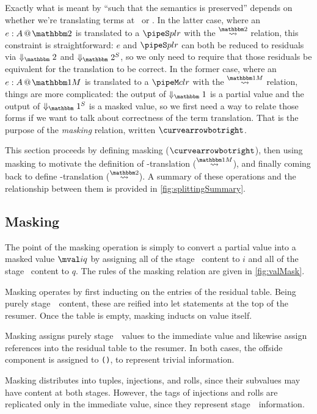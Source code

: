 \begin{abstrsyn}
Exactly what is meant by ``such that the semantics is preserved'' depends on whether we're translating
terms at \bbonem\ or \bbtwo.  
In the latter case, where an $\coltwo e A$ is translated to a $\pipeS p l r$ with the $\splittwosym$ relation,
this constraint is straightforward: $e$ and $\pipeS p l r$ can both be reduced to residuals
via $\redtwosym$ and $\sepredtwosym$, so we only need to require that those
residuals be equivalent for the translation to be correct.
In the former case, where an $\colmix e A$ is translated to a $\pipeM c l r$ with the $\splitonesym$ relation, 
things are more complicated: 
the output of $\redonesym$ is a partial value and the output of $\sepredonesym$ is a masked value,
so we first need a way to relate those forms if we want to talk about correctness of the term translation.
That is the purpose of the {\em masking} relation, written $\vsplito$.

This section proceeds by defining masking ($\vsplito$), 
then using masking to motivate the definition of \bbonem-translation ($\splitonesym$),
and finally coming back to define \bbtwo-translation ($\splittwosym$).
A summary of these operations and the relationship between them is provided in \ref{fig:splittingSummary}.

\subsection{Masking}

The point of the masking operation is simply to convert a partial value into a masked value $\mval i q$
by assigning all of the stage \bbone\ content to $i$ and all of the stage \bbtwo\ content to $q$.
The rules of the masking relation are given in \ref{fig:valMask}.

Masking operates by first inducting on the entries of the residual table.  
Being purely stage~\bbtwo\ content, these are reified into let statements at the top of the resumer.
Once the table is empty, masking inducts on value itself.

Masking assigns purely stage~\bbone\ values to the immediate value
and likewise assign references into the residual table to the resumer.
In both cases, the offside component is assigned to \texttt{()}, to represent trivial information.

Masking distributes into tuples, injections, and rolls, since their subvalues may have content at both stages.
However, the tags of injections and rolls are replicated only in the immediate value, 
since they represent stage~\bbone\ information.


\end{abstrsyn}
